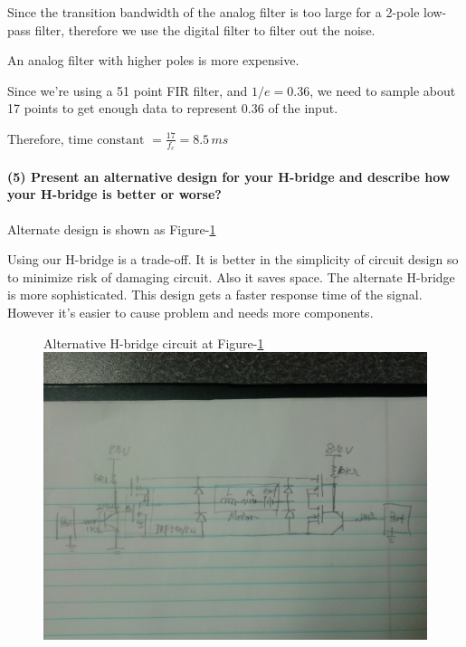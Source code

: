 \documentclass[a4paper]{article}
\newlength{\pic}
\begin{document}
Since the transition bandwidth of the analog filter is too large for a 2-pole low-pass filter, therefore we use the digital filter to filter out the noise. 

An analog filter with higher poles is more expensive. 

Since we're using a 51 point FIR filter, and $1/e = 0.36$, we need to sample about 17 points to get enough data to represent 0.36 of the input. 

Therefore, $\text{time constant } = \frac{17}{f_c} = 8.5 \, ms$

\paragraph{(5) Present an alternative design for your H-bridge and describe how your H-bridge is better or worse? \\ }

Alternate design is shown as Figure-\ref{hbridge}

Using our H-bridge is a trade-off. It is better in the simplicity of circuit design so to minimize risk of damaging circuit. Also it saves space. The alternate H-bridge is more sophisticated. This design gets a faster response time of the signal. However it's easier to cause problem and needs more components.

\setlength{\pic}{0.8\textwidth}
\begin{figure}[htp]
\noindent Alternative H-bridge circuit at Figure-\ref{hbridge}
\center
\includegraphics[width=\pic]{circuits/Alternate_H-bridge}
\caption{ }
\label{hbridge}
\end{figure}
\end{document}
